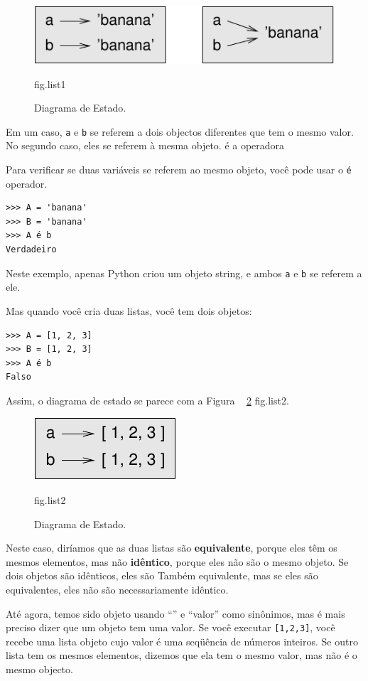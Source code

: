 \documentclass[10pt]{book}
\begin{document}
\begin{exercise}
\begin{figure}
\centerline
{\includegraphics[scale = 0.8] {figs/list1.pdf}}
\caption{Diagrama de Estado.}
\label{} fig.list1
\end{figure}


Em um caso, {\tt a} e {\tt b} se referem a dois objectos diferentes que
tem o mesmo valor. No segundo caso, eles se referem à mesma
objeto.
\index{} é a operadora

Para verificar se duas variáveis ​​se referem ao mesmo objeto, você pode
usar o {\tt é} operador.

\begin{verbatim}
>>> A = 'banana'
>>> B = 'banana'
>>> A é b
Verdadeiro
\end{verbatim}
%
Neste exemplo, apenas Python criou um objeto string,
e ambos {\tt a} e {\tt b} se referem a ele.

Mas quando você cria duas listas, você tem dois objetos:

\begin{verbatim}
>>> A = [1, 2, 3]
>>> B = [1, 2, 3]
>>> A é b
Falso
\end{verbatim}
%
Assim, o diagrama de estado se parece com a Figura ~ \ref {} fig.list2.

\begin{figure}
\centerline
{\includegraphics[scale = 0.8] {figs/list2.pdf}}
\caption{Diagrama de Estado.}
\label{} fig.list2
\end{figure}


Neste caso, diríamos que as duas listas são {\bf equivalente},
porque eles têm os mesmos elementos, mas não {\bf idêntico}, porque
eles não são o mesmo objeto. Se dois objetos são idênticos, eles são
Também equivalente, mas se eles são equivalentes, eles não são necessariamente
idêntico.

Até agora, temos sido objeto usando ``'' e ``valor''
como sinônimos, mas é mais preciso dizer que um objeto tem uma
valor. Se você executar {\tt [1,2,3]}, você recebe uma lista
objeto cujo valor é uma seqüência de números inteiros. Se outro
lista tem os mesmos elementos, dizemos que ela tem o mesmo valor, mas
não é o mesmo objecto.



\end{exercise}
\end{document}
